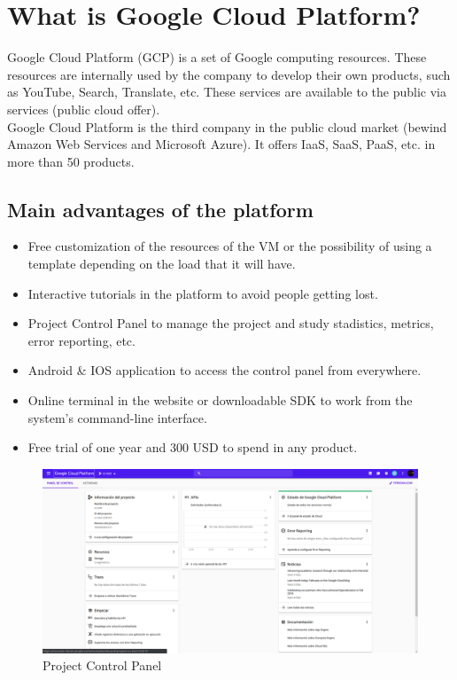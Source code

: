 \documentclass[12pt,english]{article}
\begin{document}
\section{What is Google Cloud Platform?}

Google Cloud Platform (GCP) is a set of Google computing resources. These resources are internally used by the company to develop their own products, such as YouTube, Search, Translate, etc. These services are available to the public via services (public cloud offer).\\

Google Cloud Platform is the third company in the public cloud market (bewind Amazon Web Services and Microsoft Azure). It offers IaaS, SaaS, PaaS, etc. in more than 50 products.\\

\subsection{Main advantages of the platform}

\begin{itemize}
 \item Free customization of the resources of the VM or the possibility of using a template depending on the load that it will have.
 \item Interactive tutorials in the platform to avoid people getting lost.
 \item Project Control Panel to manage the project and study stadistics, metrics, error reporting, etc.
 \item Android \& IOS application to access the control panel from everywhere.
 \item Online terminal in the website or downloadable SDK to work from the system's command-line interface.
 \item Free trial of one year and 300 USD to spend in any product.
\end{itemize}

\begin{figure}[H]
  \centering
  \includegraphics[scale = 0.35]{../img/tutorial/2controlpanel}
  \caption{Project Control Panel}
\end{figure}
\end{document}

